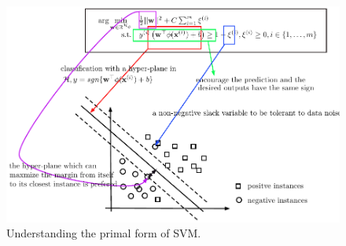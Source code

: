 \begin{figure}[t]
	\includegraphics[width=\textwidth]{./Figures/SVM_prime}	
	\caption{Understanding the primal form of SVM.}
\end{figure}


